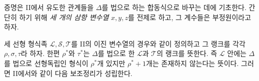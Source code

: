 
증명은 II에서 유도한 관계들을 $\Delta$를 법으로 하는 합동식으로 바꾸는 데에 기초한다. 간단히 하기 위해 \emph{세 개의 삼항 변수열} $x,y,z$를 전제로 하고, 그 계수들은 부정원이라고 하자.

세 선형 형식족 $\mathcal L,\mathcal S,\mathcal T$를 II의 이진 변수열의 경우와 같이 정의하고 그 랭크를 각각 $\rho,\sigma,\tau$라 하자. 한편 $\rho^*$와 $\tau^*$는 $\Delta$를 법으로 한 $\mathcal L$과 $\mathcal T$의 랭크를 뜻한다. 즉 $\mathcal L$ 안에는 $\Delta$를 법으로 선형독립인 형식이 $\rho^*$개 있지만 $\rho^*+1$개는 존재하지 않는다는 뜻이다. 그러면 II에서와 같이 다음 보조정리가 성립한다.
